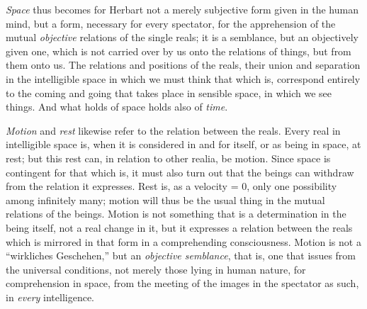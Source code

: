 \emph{Space} thus becomes for Herbart not a merely subjective form given
in the human mind, but a form, necessary for every spectator, for the
apprehension of the mutual \emph{objective} relations of the single
reals; it is a semblance, but an objectively given one, which is not
carried over by us onto the relations of things, but from them onto us.
The relations and positions of the reals, their union and separation in
the intelligible space in which we must think that which is, correspond
entirely to the coming and going that takes place in sensible space, in
which we see things. And what holds of space holds also of \emph{time}.

\emph{Motion} and \emph{rest} likewise refer to the relation between the
reals. Every real in intelligible space is, when it is considered in and
for itself, or as being in space, at rest; but this rest can, in
relation to other realia, be motion. Since space is contingent for that
which is, it must also turn out that the beings can withdraw from the
relation it expresses. Rest is, as a velocity = 0, only one possibility
among infinitely many; motion will thus be the usual thing in the mutual
relations of the beings. Motion is not something that is a determination
in the being itself, not a real change in it, but it expresses a relation
between the reals which is mirrored in that form in a comprehending
consciousness. Motion is not a ``wirkliches Geschehen,'' but an
\emph{objective semblance}, that is, one that issues from the universal
conditions, not merely those lying in human nature, for comprehension in
space, from the meeting of the images in the spectator as such, in
\emph{every} intelligence.

